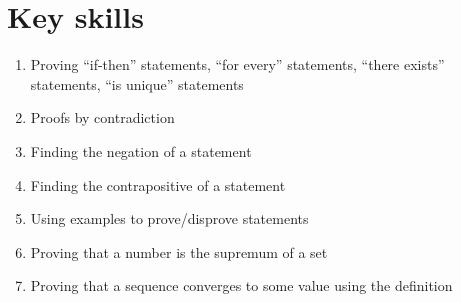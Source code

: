 \documentclass[12pt]{amsart}
\newcommand{\e}{\varepsilon}
\renewcommand{\d}{\delta}
\begin{document}
\section*{Key skills}

\begin{enumerate}
	\item Proving ``if-then'' statements, ``for every'' statements, ``there exists'' statements, ``is unique'' statements
	\item Proofs by contradiction
	\item Finding the negation of a statement
	\item Finding the contrapositive of a statement
	\item Using examples to prove/disprove statements

	\item Proving that a number is the supremum of a set

	\item Proving that a sequence converges to some value using the definition
		\begin{comment}
		\item Algebra with limits of sequences: using these to determine if a sequence converges, and to what
	\item Using squeeze theorem to show sequences converge


	\item Relationship between boundedness, convergence, and monotonicity
		\item Proofs by induction

	\item Relationship between convergence/boundedness of sequences and convergence of subsequences
	\item Using the Cauchy property to show a sequence converges

	\item Using the $\e-\d$ definition to compute limits
						
	\item Using algebra/squeeze theorem to compute limits

	\item Using the $\e-\d$ definition to show continuity

	\item Using algebra/compositions to show continuity
	\item Applying the $\e-\d$ definitions of limits and continuity 
			\item Applying the Intermediate Value Theorem
		\item Applying Boundedness and Extreme Value Theorems
		

	\item Evaluating derivatives by definition
	\item Evaluating derivatives by algebra and chain rule
	\item Using definition of derivative and Min-Max Theorem to determine when values of $f$ are larger / smaller than others
	\item Using definition of derivative and mean value theorem to determine increasing / decreasing behavior of functions
\end{comment}
\end{enumerate}
\end{document}
